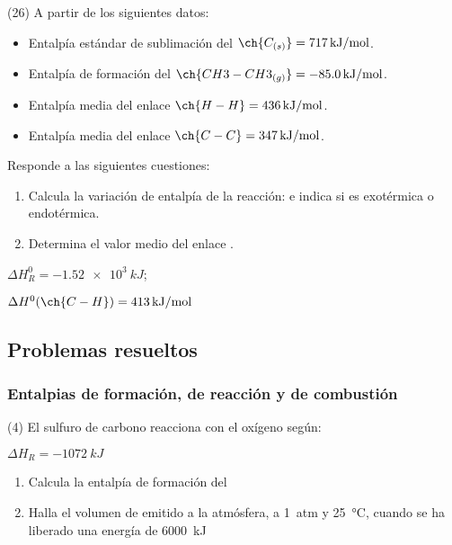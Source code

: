 \documentclass[10pt]{article}
\begin{document}
\begin{multicols}{2}
\begin{exercise}
  (26) A partir de los siguientes datos:
  \begin{itemize}
    \item Entalpía estándar de sublimación del \( \ch{C_{(s)}} = \SI{717}{kJ/mol} \).
    \item Entalpía de formación del \( \ch{CH3-CH3_{(g)}} = \SI{-85,0}{kJ/mol} \).
    \item Entalpía media del enlace \( \ch{H-H} = \SI{436}{kJ/mol} \).
    \item Entalpía media del enlace \( \ch{C-C} = \SI{347}{kJ/mol} \).
  \end{itemize}
  Responde a las siguientes cuestiones:
  \begin{enumerate}
    \item Calcula la variación de entalpía de la reacción:
     e indica si es exotérmica
    o endotérmica.
    \item Determina el valor medio del enlace .
  \end{enumerate}
\end{exercise}

\begin{solution}
  \begin{enumerate*}
    \item \( \Delta H^0_R = \SI{-1.52e3}{kJ} \); \item \( \Delta H^0 (\ch{C-H}) = \SI{413}{kJ/mol} \)
  \end{enumerate*}
\end{solution}




\subsection{Problemas resueltos}

\subsubsection{Entalpias de formación, de reacción y de combustión}


\begin{exercise}
  (4) El sulfuro de carbono reacciona con el oxígeno según:

   \( \Delta H_R = \SI{-1072}{kJ} \)

  \begin{enumerate}
    \item Calcula la entalpía de formación del 
    \item Halla el volumen de  emitido a la atmósfera, a \SI{1}{atm} y \SI{25}{\celsius}, cuando se ha liberado una energía de \SI{6000}{kJ}
  \end{enumerate}


\end{exercise}
\end{multicols}
\end{document}
